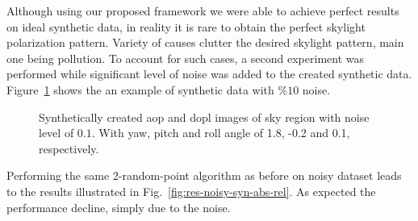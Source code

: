 Although using our proposed framework we were able to achieve perfect results
on ideal synthetic data, in reality it is rare to obtain the perfect skylight
polarization pattern. Variety of causes clutter the desired skylight pattern,
main one being pollution. To account for such cases, a second experiment was
performed while significant level of noise was added to the created synthetic
data.
Figure~\ref{fig:aop-dop-syn-noisy} shows the an example of synthetic data with
$\%10$ noise.

\begin{figure}
  \centering
  \hfill
  \hspace*{\fill}
  \caption{Synthetically created \gls{aop} and \gls{dopl} images of sky
      region with noise level of $0.1$. With yaw, pitch and roll angle of 1.8, -0.2 and 0.1, respectively.}
  \label{fig:aop-dop-syn-noisy}
\end{figure}

Performing the same 2-random-point algorithm as before on noisy dataset leads
to the results illustrated in Fig.~\ref{fig:res-noisy-syn-abs-rel}. As expected the
performance decline, simply due to the noise.

